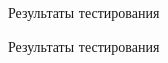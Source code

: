 \documentclass{beamer}
\begin{document}
\begin{frame}{Результаты тестирования}
\end{frame}

\begin{frame}{Результаты тестирования}
\end{frame}
\end{document}
